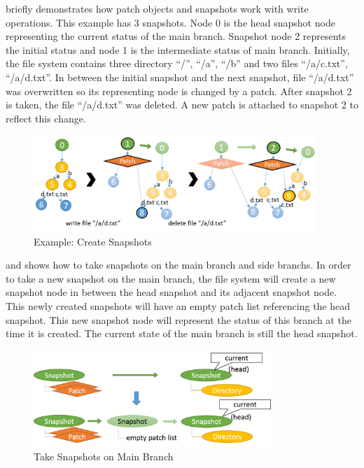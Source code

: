 	 briefly demonstrates how patch objects and snapshots work with write operations. This example has 3 snapshots. Node 0 is the head snapshot node representing the current status of the main branch. Snapshot node 2 represents the initial status and node 1 is the intermediate status of main branch. Initially, the file system contains three directory ``/'', ``/a'', ``/b'' and two files ``/a/c.txt'', ``/a/d.txt''. In between the initial snapshot and the next snapshot, file ``/a/d.txt'' was overwritten so its representing node is changed by a patch. After snapshot 2 is taken, the file ``/a/d.txt'' was deleted. A new patch is attached to snapshot 2 to reflect this change.

\begin{figure}[t]
\centering
\includegraphics[width=0.95\textwidth]{Chapter-4/figs/fig26.png}
\caption{Example: Create Snapshots}
\label{fig:create_snapshots}
\end{figure}

     and  shows how to take snapshots on the main branch and side branchs. In order to take a new snapshot on the main branch, the file system will create a new snapshot node in between the head snapshot and its adjacent snapshot node. This newly created snapshots will have an empty patch list referencing the head snapshot. This new snapshot node will represent the status of this branch at the time it is created. The current state of the main branch is still the head snapshot.

\begin{figure}[t]
\centering
\includegraphics[width=0.8\textwidth]{Chapter-4/figs/fig20.png}
\caption{Take Snapshots on Main Branch}
\label{fig:take_snapshot_root}
\end{figure}
    
